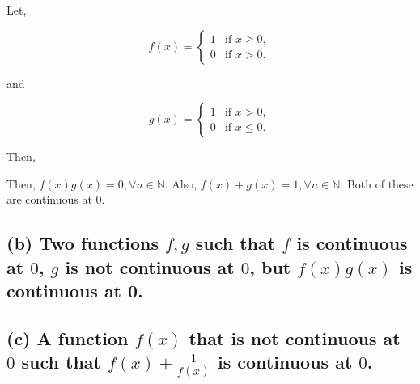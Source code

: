 \documentclass{article}
\begin{document}
Let,

\begin{equation}
    f(x) =
        \begin{cases}
            1 & \text{if } x \ge 0, \\
            0 & \text{if } x > 0.
        \end{cases}
    \end{equation}

and

\begin{equation}
    g(x) =
        \begin{cases}
            1 & \text{if } x > 0, \\
            0 & \text{if } x \le 0.
        \end{cases}
    \end{equation}

Then, 

Then, $f(x)g(x) = 0, \forall n \in \mathbb{N}$. Also, $f(x) + g(x) = 1, \forall n \in \mathbb{N}$. Both of these are continuous at 0.

\subsection*{(b) Two functions $f, g$ such that $f$ is continuous at $0$, $g$ is not continuous at $0$, but $f(x)g(x)$ is continuous at 0.}

\subsection*{(c) A function $f(x)$ that is not continuous at $0$ such that $f(x) + \frac{1}{f(x)}$ is continuous at $0$.}
\end{document}
